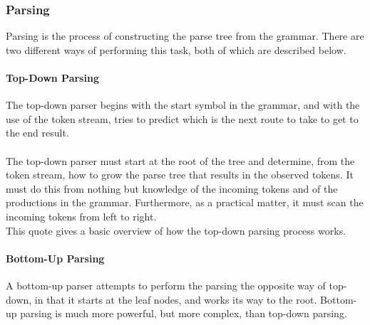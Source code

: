 \documentclass[12pt]{report}
\begin{document}
\subsubsection{Parsing}\label{subsec:parsing}
Parsing is the process of constructing the parse tree from the grammar.  There are two different ways of performing this task, both of which are described below.
\paragraph{Top-Down Parsing}
The top-down parser begins with the start symbol in the grammar, and with the use of the token stream, tries to predict which is the next route to take to get to the end result.\\
\\
The top-down parser must start at the root of the tree and determine, from the token stream, how to grow the parse tree that results in the observed tokens.  It must do this from nothing but knowledge of the incoming tokens and of the productions in the grammar.  Furthermore, as a practical matter, it must scan the incoming tokens from left to right. \citep{compilerconstruction92}
\\
This quote gives a basic overview of how the top-down parsing process works.
\paragraph{Bottom-Up Parsing}
A bottom-up parser attempts to perform the parsing the opposite way of top-down, in that it starts at the leaf nodes, and works its way to the root.  Bottom-up parsing is much more powerful, but more complex, than top-down parsing.
\end{document}
